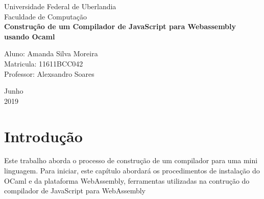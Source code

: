 \documentclass[12pt,a4paper,twoside]{article}
\begin{document}

\begin{titlepage}
	\begin{center}
	

		\Huge{Universidade Federal de Uberlandia}\\
		\large{Faculdade de Computação}\\ 
		\vspace{55pt}
        \vspace{95pt}
        \textbf{\LARGE{Construção de um Compilador de JavaScript para Webassembly usando Ocaml }}\\
		\vspace{3,5cm}
	\end{center}
	
	\vspace{55pt}
	\begin{flushleft}
		\begin{tabbing}
		
		
			Aluno: Amanda Silva Moreira\\
			Matricula: 11611BCC042\\
			Professor: Alexsandro Soares\\
	\end{tabbing}
 \end{flushleft}
	\vspace{1cm}
	
	\begin{center}
		\vspace{\fill}
			Junho\\
		 2019
			\end{center}
\end{titlepage}


\newpage
\tableofcontents
\thispagestyle{empty}

\newpage
{}
\section{Introdução}
Este trabalho aborda o processo de construção de um compilador para uma mini linguagem. Para iniciar, este capítulo abordará os procedimentos de instalação do OCaml e da plataforma WebAssembly, ferramentas utilizadas na contrução do compilador de JavaScript para WebAssembly
\end{document}
